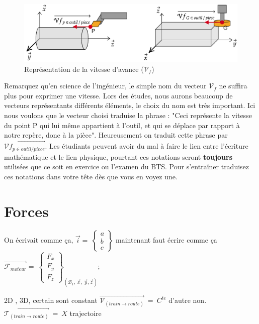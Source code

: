 \documentclass[
	11pt, %
	fleqn, %
	a4paper, %
]{LegrandOrangeBook}
\begin{document}
\begin{figure}[H]  %
	\centering %
	\includegraphics[width=1\textwidth]{Images/vit1.png} %
    \caption{Représentation de la vitesse d'avance ($\mathcal{V}_f$)}
	\label{vet1} %
\end{figure}

Remarquez qu'en science de l'ingénieur, le simple nom du vecteur $\mathcal{V}_f$ ne suffira plus pour exprimer une vitesse. Lors des études, nous aurons beaucoup de vecteurs représentants différents éléments, le choix du nom est très important. Ici nous voulons que le vecteur choisi traduise la phrase : "Ceci représente la vitesse du point P qui lui même appartient à l'outil, et qui se déplace par rapport à notre repère, donc à la pièce". Heureusement on traduit cette phrase par $\overrightarrow{\mathcal{V}f_{p \in outil / piece}}$. Les étudiants peuvent avoir du mal à faire le lien entre l'écriture mathématique et le lien physique, pourtant ces notations seront \textbf{toujours} utilisées que ce soit en exercice ou l'examen du BTS. Pour s'entraîner traduisez ces notations dans votre tête dès que vous en voyez une.


\section{Forces}
On écrivait comme ça,  $\Vec{i}=\ \begin{Bmatrix} a\\ b \\ c \end{Bmatrix} $  maintenant faut écrire comme ça 
 {$\overrightarrow{\mathcal{F}_{moteur}} =\ \begin{Bmatrix}
F_{x}\\
F_{y}\\
F_{z}
\end{Bmatrix}_{( \mathcal{B}_{1} ,\ \vec{x} ,\ \vec{y} ,\vec{z})}$};

2D , 3D, certain sont constant $\overrightarrow{\mathcal{V}_{(train\rightarrow route)}} \ =\ C^{te}$ d'autre non. $\overrightarrow{\mathcal{T}_{(train\rightarrow route)}} \ =\ X$ trajectoire
\end{document}
